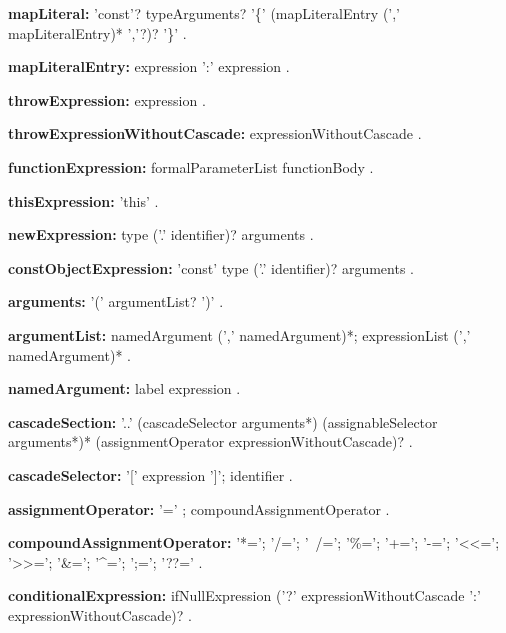 \begin{grammar}
{\bf mapLiteral:}
    'const'?  typeArguments? '\{' (mapLiteralEntry (',' mapLiteralEntry)* ','?)? '\}'
    .

{\bf mapLiteralEntry:}
    expression ':' expression 
    .
\end{grammar}
\begin{grammar}
{\bf throwExpression:}
    \THROW{} expression 
    .
    
{\bf throwExpressionWithoutCascade:}
    \THROW{} expressionWithoutCascade 
    .
\end{grammar}
\begin{grammar}
{\bf functionExpression:}
    formalParameterList functionBody
    .
\end{grammar}
\begin{grammar}
{\bf thisExpression:}
    'this'
    .
\end{grammar}
\begin{grammar}
{\bf newExpression:}
    \NEW{} type ('.' identifier)? arguments
    .
\end{grammar}
\begin{grammar}
{\bf constObjectExpression:}
    'const' type ('.' identifier)? arguments
    .
\end{grammar}
\begin{grammar}
{\bf arguments:}
    '(' argumentList? ')'
    .

{\bf argumentList:}
    namedArgument (',' namedArgument)*;
    expressionList (',' namedArgument)*
    .

{\bf namedArgument:}
    label expression
    .
\end{grammar}
\begin{grammar}
{\bf cascadeSection:}
    '..' (cascadeSelector arguments*) (assignableSelector arguments*)* (assignmentOperator expressionWithoutCascade)?
    .
     
{\bf cascadeSelector:}
    '['  expression ']';
    identifier
    .
\end{grammar}
\begin{grammar}
{\bf assignmentOperator:}
    '=' ;
    compoundAssignmentOperator
    .
\end{grammar}
\begin{grammar}
{\bf compoundAssignmentOperator:}
    '*=';
    '/=';
    '~/=';
    '\%=';
    '+=';
    '-=';
    '<<=';
    '>>=';
    '&=';
    '^=';
    ';=';
    '??='
    .
\end{grammar}
\begin{grammar}
{\bf conditionalExpression:}
    ifNullExpression ('?' expressionWithoutCascade ':' expressionWithoutCascade)?
    .
\end{grammar}
